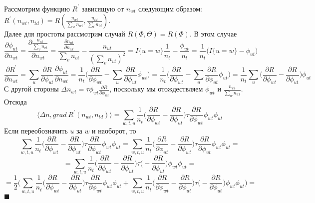 \documentclass[12pt]{article}
\newenvironment{Proof} 
	{\par\noindent{\bf Доказательство.}} 
	{\hfill$\blacksquare$}
\begin{document}
\begin{Proof}\\
Рассмотрим функцию $R^{\prime}$ зависящую от $n_{wt}$ следующим образом: $R^{\prime}(n_{wt}, n_{td}) = R( \frac{n_{wt}}{\sum\limits_w n_{wt}},  \frac{n_{td}}{\sum\limits_t n_{td}})$. \\
Далее для простоты рассмотрим случай $R(\Phi, \Theta) = R(\Phi)$. В этом случае 
\[
\frac{\partial{\phi_{ut}}}{\partial{n_{wt}}} = \frac{\partial{ \frac{n_{ut}}{\sum\limits_v n_{vt}}}}{\partial{n_{wt}}} = \frac{ \frac{\partial{n_{ut}}}{\partial{n_{wt}}}}{\sum\limits_v n_{vt}} - \frac{n_{ut}}{(\sum\limits_v n_{vt})^2} = I\{u = w\} \frac{1}{n_t} - \frac{\phi_{ut}}{n_t} = \frac{1}{n_t}\bigg( 
 I\{u = w\} - \phi_{ut} \bigg)
\]
\[
\frac{\partial{R^{\prime}}}{\partial{n_{wt}}} = \sum_{u} \frac{\partial{R}}{\partial{\phi_{ut}}} \frac{\partial{\phi_{ut}}}{\partial{n_{wt}}} = \frac{1}{n_t} \bigg( \frac{\partial{R}}{\partial{\phi_{wt}}} - \sum_{u}  \frac{\partial{R}}{\partial{\phi_{ut}}} \phi_{wt} \bigg) = \frac{1}{n_t} \bigg( \frac{\partial{R}}{\partial{\phi_{wt}}} - \sum_{u}  \frac{\partial{R}}{\partial{\phi_{ut}}} \phi_{ut} \bigg) = \frac{1}{n_t} \sum_{u} \bigg(\frac{\partial{R}}{\partial{\phi_{wt}}}  -  \frac{\partial{R}}{\partial{\phi_{ut}}} \bigg)  \phi_{ut}
\]
С другой стороны $\Delta n_{wt} = \tau \phi_{wt} \frac{\partial{R}}{\partial{\phi_{wt}}}$, поскольку мы отождествляем $\phi_{wt}$ и $\frac{n_{wt}}{\sum\limits_w n_{wt}}$. Отсюда
\[
\langle \Delta n, grad\ R^{\prime}(n_{wt}, n_{td})\rangle = \sum\limits_{w, t, u}  \frac{1}{n_{t}}  \bigg(  \frac{\partial{R}}{\partial{\phi_{wt}}}  -  \frac{\partial{R}}{\partial{\phi_{ut}}}  \bigg)  \tau \frac{\partial{R}}{\partial{\phi_{wt}}} \phi_{wt} \phi_{ut}
\]
Если переобозначить $u$ за $w$ и наоборот, то 
\[
\sum\limits_{w, t, u}  \frac{1}{n_{t}}  \bigg(  \frac{\partial{R}}{\partial{\phi_{wt}}}  -  \frac{\partial{R}}{\partial{\phi_{ut}}}  \bigg)  \tau \frac{\partial{R}}{\partial{\phi_{wt}}} \phi_{wt} \phi_{ut}  = \sum\limits_{w, t, u}  \frac{1}{n_{t}}  \bigg(  \frac{\partial{R}}{\partial{\phi_{ut}}}  -  \frac{\partial{R}}{\partial{\phi_{wt}}}  \bigg)  \tau \frac{\partial{R}}{\partial{\phi_{ut}}} \phi_{wt} \phi_{ut} = 
\]
\[
= \sum\limits_{w, t, u}  \frac{1}{n_{t}}  \bigg(  \frac{\partial{R}}{\partial{\phi_{wt}}}  -  \frac{\partial{R}}{\partial{\phi_{ut}}}  \bigg)  \tau \big(-\frac{\partial{R}}{\partial{\phi_{ut}}}\big) \phi_{wt} \phi_{ut} = 
\]
\[
= \frac12 \bigg(\sum\limits_{w, t, u}  \frac{1}{n_{t}}  \bigg(  \frac{\partial{R}}{\partial{\phi_{wt}}}  -  \frac{\partial{R}}{\partial{\phi_{ut}}}  \bigg)  \tau \frac{\partial{R}}{\partial{\phi_{wt}}} \phi_{wt} \phi_{ut} +  \sum\limits_{w, t, u}  \frac{1}{n_{t}}  \bigg(  \frac{\partial{R}}{\partial{\phi_{wt}}}  -  \frac{\partial{R}}{\partial{\phi_{ut}}}  \bigg)  \tau \big(-\frac{\partial{R}}{\partial{\phi_{ut}}}\big) \phi_{wt} \phi_{ut} \bigg)= 
\]
\end{Proof}
\end{document}
